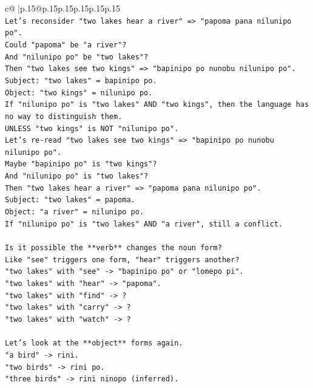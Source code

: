 \documentclass{article}
\begin{document}
{\begin{supertabular}{c@{$\;$}|p{.15\linewidth}@{}p{.15\linewidth}p{.15\linewidth}p{.15\linewidth}p{.15\linewidth}p{.15\linewidth}}
{{{\\ 
\texttt{Let's reconsider "two lakes hear a river" => "papoma pana nilunipo po".} \\
\texttt{Could "papoma" be "a river"?} \\
\texttt{And "nilunipo po" be "two lakes"?} \\
\texttt{Then "two lakes see two kings" => "bapinipo po nunobu nilunipo po".} \\
\texttt{Subject: "two lakes" = bapinipo po.} \\
\texttt{Object: "two kings" = nilunipo po.} \\
\texttt{If "nilunipo po" is "two lakes" AND "two kings", then the language has no way to distinguish them.} \\
\texttt{UNLESS "two kings" is NOT "nilunipo po".} \\
\texttt{Let's re{-}read "two lakes see two kings" => "bapinipo po nunobu nilunipo po".} \\
\texttt{Maybe "bapinipo po" is "two kings"?} \\
\texttt{And "nilunipo po" is "two lakes"?} \\
\texttt{Then "two lakes hear a river" => "papoma pana nilunipo po".} \\
\texttt{Subject: "two lakes" = papoma.} \\
\texttt{Object: "a river" = nilunipo po.} \\
\texttt{If "nilunipo po" is "two lakes" AND "a river", still a conflict.} \\
\\ 
\texttt{Is it possible the **verb** changes the noun form?} \\
\texttt{Like "see" triggers one form, "hear" triggers another?} \\
\texttt{"two lakes" with "see" {-}> "bapinipo po" or "lomepo pi".} \\
\texttt{"two lakes" with "hear" {-}> "papoma".} \\
\texttt{"two lakes" with "find" {-}> ?} \\
\texttt{"two lakes" with "carry" {-}> ?} \\
\texttt{"two lakes" with "watch" {-}> ?} \\
\\ 
\texttt{Let's look at the **object** forms again.} \\
\texttt{"a bird" {-}> rini.} \\
\texttt{"two birds" {-}> rini po.} \\
\texttt{"three birds" {-}> rini ninopo (inferred).} \\
}}}
\end{supertabular}}
\end{document}
